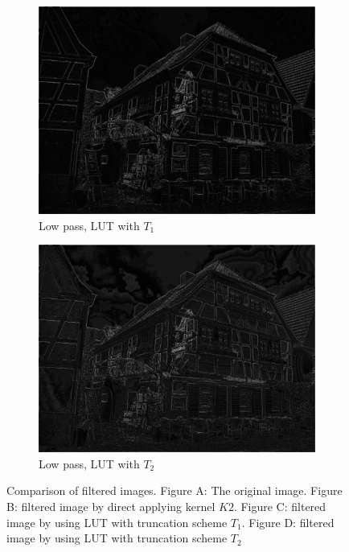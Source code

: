 \documentclass[12pt]{amsart}
\theoremstyle{definition}
\theoremstyle{remark}
\numberwithin{thm}{section}
\begin{document}
\begin{figure}[h]
\begin{subfigure}[b]{0.4\textwidth} \includegraphics[width=\textwidth]{house_lut_212.png} \caption{Low pass, LUT with $T_1$} %
\end{subfigure}
\begin{subfigure}[b]{0.4\textwidth} \includegraphics[width=\textwidth]{house_lut_424.png} \caption{Low pass, LUT with $T_2$} \end{subfigure}
\caption{Comparison of filtered images. Figure A: The original image. Figure B: filtered image by direct applying kernel $K2$. Figure C: filtered image by using LUT with truncation scheme $T_1$. Figure D: filtered image by using LUT with truncation scheme $T_2$}
\end{figure}
\end{document}
